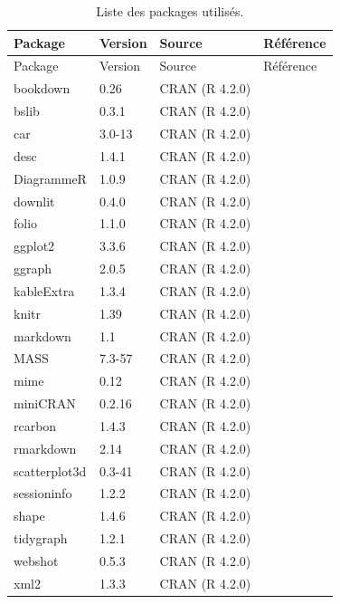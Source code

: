 \documentclass[
  french,
]{scrbook}
\begin{document}
\begin{longtable}[]{@{}llll@{}}
\caption{\label{tab:packages}Liste des packages utilisés.}\tabularnewline
\toprule
Package & Version & Source & Référence \\
\midrule
\endfirsthead
\toprule
Package & Version & Source & Référence \\
\midrule
\endhead
bookdown & 0.26 & CRAN (R 4.2.0) & \textcite{R-bookdown} \\
bslib & 0.3.1 & CRAN (R 4.2.0) & \textcite{R-bslib} \\
car & 3.0-13 & CRAN (R 4.2.0) & \textcite{R-car} \\
desc & 1.4.1 & CRAN (R 4.2.0) & \textcite{R-desc} \\
DiagrammeR & 1.0.9 & CRAN (R 4.2.0) & \textcite{R-DiagrammeR} \\
downlit & 0.4.0 & CRAN (R 4.2.0) & \textcite{R-downlit} \\
folio & 1.1.0 & CRAN (R 4.2.0) & \textcite{R-folio} \\
ggplot2 & 3.3.6 & CRAN (R 4.2.0) & \textcite{R-ggplot2} \\
ggraph & 2.0.5 & CRAN (R 4.2.0) & \textcite{R-ggraph} \\
kableExtra & 1.3.4 & CRAN (R 4.2.0) & \textcite{R-kableExtra} \\
knitr & 1.39 & CRAN (R 4.2.0) & \textcite{R-knitr} \\
markdown & 1.1 & CRAN (R 4.2.0) & \textcite{R-markdown} \\
MASS & 7.3-57 & CRAN (R 4.2.0) & \textcite{R-MASS} \\
mime & 0.12 & CRAN (R 4.2.0) & \textcite{R-mime} \\
miniCRAN & 0.2.16 & CRAN (R 4.2.0) & \textcite{R-miniCRAN} \\
rcarbon & 1.4.3 & CRAN (R 4.2.0) & \textcite{R-rcarbon} \\
rmarkdown & 2.14 & CRAN (R 4.2.0) & \textcite{R-rmarkdown} \\
scatterplot3d & 0.3-41 & CRAN (R 4.2.0) & \textcite{R-scatterplot3d} \\
sessioninfo & 1.2.2 & CRAN (R 4.2.0) & \textcite{R-sessioninfo} \\
shape & 1.4.6 & CRAN (R 4.2.0) & \textcite{R-shape} \\
tidygraph & 1.2.1 & CRAN (R 4.2.0) & \textcite{R-tidygraph} \\
webshot & 0.5.3 & CRAN (R 4.2.0) & \textcite{R-webshot} \\
xml2 & 1.3.3 & CRAN (R 4.2.0) & \textcite{R-xml2} \\
\bottomrule
\end{longtable}
\end{document}
